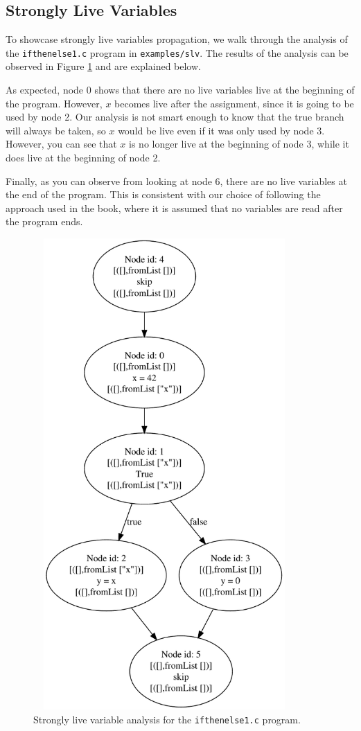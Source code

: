 \documentclass{article}
\begin{document}
\subsection*{Strongly Live Variables}

To showcase strongly live variables propagation, we walk through the analysis of the \texttt{ifthenelse1.c} program in \texttt{examples/slv}. The results of the analysis can be observed in Figure \ref{fig-slv} and are explained below.

As expected, node 0 shows that there are no live variables live at the beginning of the program. However, $x$ becomes live after the assignment, since it is going to be used by node 2. Our analysis is not smart enough to know that the true branch will always be taken, so $x$ would be live even if it was only used by node 3. However, you can see that $x$ is no longer live at the beginning of node 3, while it does live at the beginning of node 2.

Finally, as you can observe from looking at node 6, there are no live variables at the end of the program. This is consistent with our choice of following the approach used in the book, where it is assumed that no variables are read after the program ends.

\begin{figure}
	\centering
	\includegraphics[width=10cm, height=18cm]{slv_ifthenelse1}
	\caption{Strongly live variable analysis for the \texttt{ifthenelse1.c} program.}
	\label{fig-slv}
\end{figure}
\end{document}
